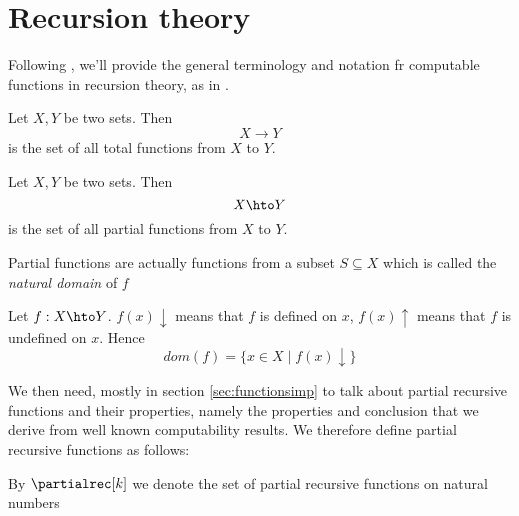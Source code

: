 \section{Recursion theory}

Following \cite{ranzato:analysis}, we'll provide the general
terminology and notation fr computable functions in recursion theory,
as in
\cite{cutland1980computability,odifreddi1992classical,rogers1987theory}.

\begin{definition}
  Let \(X,Y\) be two sets. Then \[X \to Y\] is the set of all total
  functions from \(X\) to \(Y\).
\end{definition}

\begin{definition}
  Let \(X,Y\) be two sets. Then \[X \hto Y\] is the set of all partial
  functions from \(X\) to \(Y\).
\end{definition}
\noindent

Partial functions are actually functions from a subset
\(S \subseteq X\) which is called the \emph{natural domain} of \(f\)

\begin{definition}
  Let \(f : X \hto Y\). \(f(x)\downarrow\) means that \(f\) is defined
  on \(x\), \(f(x)\uparrow\) means that \(f\) is undefined on
  \(x\). Hence \[dom(f) = \{x \in X \mid f(x)\downarrow\}\]
\end{definition}



We then need, mostly in section \ref{sec:functionsimp} to talk about
partial recursive functions and their properties, namely the
properties and conclusion that we derive from well known computability
results. We therefore define partial recursive functions as follows:

\begin{notation}\label{bg:partialrec}
  By \(\partialrec[k]\) we denote the set of partial recursive
  functions on natural numbers
\end{notation}

